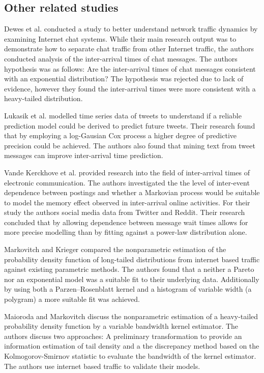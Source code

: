 \documentclass[conference]{IEEEtran}
\begin{document}
\subsection{Other related studies}

Dewes et al. \cite{dewes2003analysis} conducted a study to better understand network traffic dynamics by examining Internet chat systems. While their main research output was to demonstrate how to separate chat traffic from other Internet traffic, the authors conducted analysis of the inter-arrival times of chat messages. The authors hypothesis was as follows: Are the inter-arrival times of chat messages consistent with an exponential distribution? The hypothesis was rejected due to lack of evidence, however they found the inter-arrival times were more consistent with a heavy-tailed distribution.

Lukasik et al. \cite{lukasik2015modeling} modelled time series data of tweets to understand if a reliable prediction model could be derived to predict future tweets. Their research found that by employing a log-Gausian Cox process a higher degree of predictive precision could be achieved. The authors also found that mining text from tweet messages can improve inter-arrival time prediction.

Vande Kerckhove et al. \cite{vande2015markov} provided research into the field of inter-arrival times of electronic communication. The authors investigated the the level of inter-event dependence between postings and whether a Markovian process would be suitable to model the memory effect observed in inter-arrival online activities. For their study the authors social media data from Twitter and Reddit. Their research concluded that by allowing dependence between message wait times allows for more precise modelling than by fitting against a power-law distribution alone.

Markovitch and Krieger \cite{markovitch2000nonparametric} compared the nonparametric estimation of the probability density function of long-tailed distributions from internet based traffic against existing parametric methods. The authors found that a neither a Pareto nor an exponential model was a suitable fit to their underlying data. Additionally by using both a Parzen--Rosenblatt kernel and a histogram of variable width (a polygram) a more suitable fit was achieved.

Maioroda and Markovitch \cite{maiboroda2004estimation} discuss the nonparametric estimation of a heavy-tailed probability density function by a variable bandwidth kernel estimator. The authors discuss two approaches: A preliminary transformation to provide an information estimation of tail density and a the discrepancy method based on the Kolmogorov-Smirnov statistic to evaluate the bandwidth of the kernel estimator. The authors use internet based traffic to validate their models.
\end{document}
